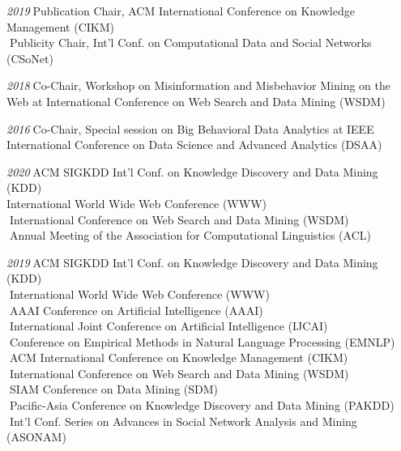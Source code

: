\documentclass[10pt]{article}
\newenvironment{myindentpar}[1]%
{\begin{list}{}%
         {\setlength{\leftmargin}{#1}}%
         \item[]%
}
{\end{list}}
\newcounter{list}
\begin{document}
\begin{myindentpar}{0.75cm}
{\hspace{-0.75cm}\emph{2019}\textcolor{white}{.}Publication Chair, ACM International Conference on Knowledge Management (CIKM) \\
\textcolor{white}{.}Publicity Chair, Int'l Conf. on Computational Data and Social Networks (CSoNet)

\hspace{-0.75cm}\emph{2018}\textcolor{white}{.}Co-Chair, Workshop on Misinformation and Misbehavior Mining on the Web at International Conference on Web Search and Data Mining (WSDM)

\hspace{-0.75cm}\emph{2016}\textcolor{white}{.}Co-Chair, Special session on Big Behavioral Data Analytics at IEEE International Conference on Data Science and Advanced Analytics (DSAA)

}


\hspace{-0.75cm}{\bf Program Committee}

{\small

\hspace{-0.75cm}\emph{2020}\textcolor{white}{.}ACM SIGKDD Int'l Conf. on Knowledge Discovery and Data Mining (KDD) \\
International World Wide Web Conference (WWW) \\
\textcolor{white}{.}International Conference on Web Search and Data Mining (WSDM) \\
\textcolor{white}{.}Annual Meeting of the Association for Computational Linguistics (ACL)

\hspace{-0.75cm}\emph{2019}\textcolor{white}{.}ACM SIGKDD Int'l Conf. on Knowledge Discovery and Data Mining (KDD) \\
\textcolor{white}{.}International World Wide Web Conference (WWW) \\
\textcolor{white}{.}AAAI Conference on Artificial Intelligence (AAAI) \\
\textcolor{white}{.}International Joint Conference on Artificial Intelligence (IJCAI) \\
\textcolor{white}{.}Conference on Empirical Methods in Natural Language Processing (EMNLP) \\
\textcolor{white}{.}ACM International Conference on Knowledge Management (CIKM) \\
\textcolor{white}{.}International Conference on Web Search and Data Mining (WSDM) \\
\textcolor{white}{.}SIAM Conference on Data Mining (SDM) \\
\textcolor{white}{.}Pacific-Asia Conference on Knowledge Discovery and Data Mining (PAKDD) \\
\textcolor{white}{.}Int'l Conf. Series on Advances in Social Network Analysis and Mining (ASONAM)
	
}
\end{myindentpar}
\end{document}
